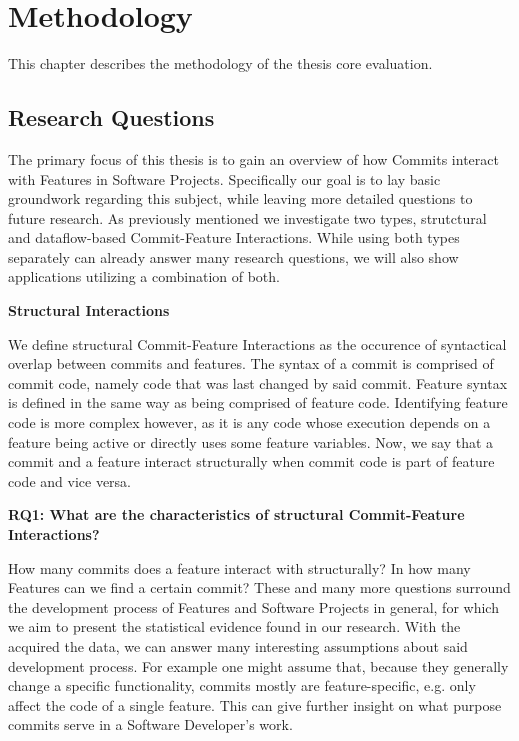\section*{Methodology}\label{ch:methodology}

This chapter describes the methodology of the thesis core evaluation.

\subsection*{Research Questions}\label{sec:research_questions}

The primary focus of this thesis is to gain an overview of how Commits interact with Features in Software Projects.
Specifically our goal is to lay basic groundwork regarding this subject, while leaving more detailed questions to future research.
As previously mentioned we investigate two types, strutctural and dataflow-based Commit-Feature Interactions.
While using both types separately can already answer many research questions, we will also show applications utilizing a combination of both.

\textbf{Structural Interactions} 

We define structural Commit-Feature Interactions as the occurence of syntactical overlap between commits and features.
The syntax of a commit is comprised of commit code, namely code that was last changed by said commit.
Feature syntax is defined in the same way as being comprised of feature code. 
Identifying feature code is more complex however, as it is any code whose execution depends on a feature being active or directly uses some feature variables. 
Now, we say that a commit and a feature interact structurally when commit code is part of feature code and vice versa. 

\textbf{RQ1: What are the characteristics of structural Commit-Feature Interactions?}

How many commits does a feature interact with structurally? In how many Features can we find a certain commit?
These and many more questions surround the development process of Features and Software Projects in general, for which we aim to present the statistical evidence found in our research.
With the acquired the data, we can answer many interesting assumptions about said development process.
For example one might assume that, because they generally change a specific functionality, commits mostly are feature-specific, e.g. only affect the code of a single feature.
This can give further insight on what purpose commits serve in a Software Developer's work.

